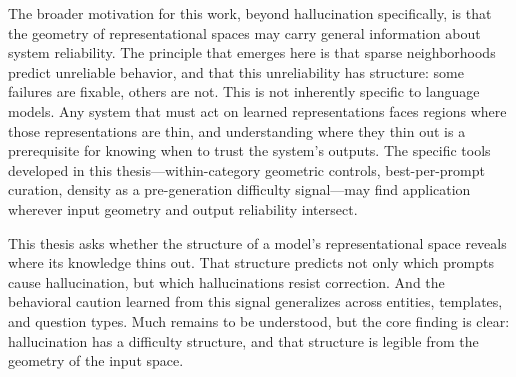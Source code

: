 The broader motivation for this work, beyond hallucination specifically, is that the geometry of representational spaces may carry general information about system reliability. The principle that emerges here is that sparse neighborhoods predict unreliable behavior, and that this unreliability has structure: some failures are fixable, others are not. This is not inherently specific to language models. Any system that must act on learned representations faces regions where those representations are thin, and understanding where they thin out is a prerequisite for knowing when to trust the system's outputs. The specific tools developed in this thesis---within-category geometric controls, best-per-prompt curation, density as a pre-generation difficulty signal---may find application wherever input geometry and output reliability intersect.

This thesis asks whether the structure of a model's representational space reveals where its knowledge thins out. That structure predicts not only which prompts cause hallucination, but which hallucinations resist correction. And the behavioral caution learned from this signal generalizes across entities, templates, and question types. Much remains to be understood, but the core finding is clear: hallucination has a difficulty structure, and that structure is legible from the geometry of the input space.
